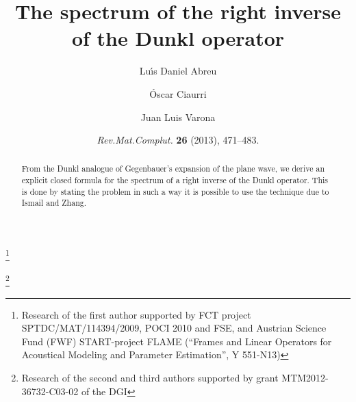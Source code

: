 \documentclass[12pt,a4paper]{amsart}
\theoremstyle{plain}
\theoremstyle{definition}
\begin{document}

\renewcommand{\datename}{\textbf{THIS PAPER HAS BEEN PUBLISHED IN:}}
\date{\textit{Rev.\@ Mat.\@ Complut.\@} \textbf{26} (2013), 471--483.}

\title[The spectrum of the right inverse of the Dunkl operator]{%
The spectrum of the right inverse of the Dunkl operator}


\author[L. D. Abreu]{Lu\'{\i}s Daniel Abreu}
\address{CMUC and Departamento de Matem\'atica,
Universidade de Coimbra,
Faculdade de Ci\^{e}ncias e Tecnologia (FCTUC),
3001-454 Coimbra, Portugal}
\thanks{Research of the first author supported by FCT project
SPTDC/MAT/114394/2009, POCI 2010 and FSE, and Austrian Science Fund (FWF) 
START-project FLAME (``Frames and Linear Operators for Acoustical Modeling
and Parameter Estimation'', Y 551-N13)}

\author[\'O. Ciaurri]{\'Oscar Ciaurri}
\address{CIME and Departamento de Matem\'aticas y Computaci\'on,
Universidad de La Rioja, %
26004 Logro\~no, Spain}

\author[J. L. Varona]{Juan Luis Varona}
\address{CIME and Departamento de Matem\'aticas y Computaci\'on,
Universidad de La Rioja, %
26004 Logro\~no, Spain}
\thanks{Research of the second and third authors supported 
by grant MTM2012-36732-C03-02 of the DGI}




\begin{abstract}
From the Dunkl analogue of Gegenbauer's expansion of the plane wave, 
we derive an explicit closed formula for the spectrum of a right 
inverse of the Dunkl operator. This is done by stating the problem 
in such a way it is possible to use the technique due to Ismail and Zhang.
\end{abstract}

\maketitle
\end{document}
